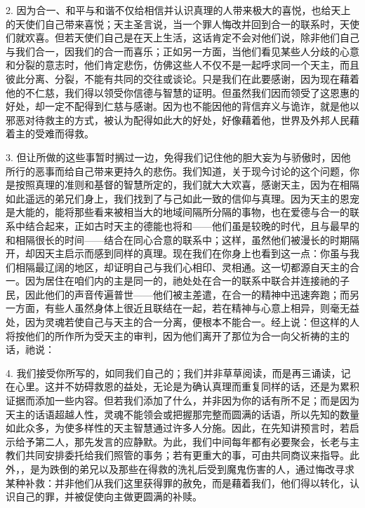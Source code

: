 2. 因为合一、和平与和谐不仅给相信并认识真理的人带来极大的喜悦，也给天上的天使们自己带来喜悦；天主圣言说，当一个罪人悔改并回到合一的联系时，天使们就欢喜。但若天使们自己是在天上生活，这话肯定不会对他们说，除非他们自己与我们合一，因我们的合一而喜乐；正如另一方面，当他们看见某些人分歧的心意和分裂的意志时，他们肯定悲伤，仿佛这些人不仅不是一起呼求同一个天主，而且彼此分离、分裂，不能有共同的交往或谈论。只是我们在此要感谢，因为现在藉着他的不仁慈，我们得以领受你信德与智慧的证明。但虽然我们因而领受了这恩惠的好处，却一定不配得到仁慈与感谢。因为也不能因他的背信弃义与诡诈，就是他以邪恶对待救主的方式，被认为配得如此大的好处，好像藉着他，世界及外邦人民藉着主的受难而得救。\par

3. 但让所做的这些事暂时搁过一边，免得我们记住他的胆大妄为与骄傲时，因他所行的恶事而给自己带来更持久的悲伤。我们知道，关于现今讨论的这个问题，你是按照真理的准则和基督的智慧所定的，我们就大大欢喜，感谢天主，因为在相隔如此遥远的弟兄们身上，我们找到了与己如此一致的信仰与真理。因为天主的恩宠是大能的，能将那些看来被相当大的地域间隔所分隔的事物，也在爱德与合一的联系中结合起来，正如古时天主的德能也将和——他们虽是较晚的时代，且与最早的和相隔很长的时间——结合在同心合意的联系中；这样，虽然他们被漫长的时期隔开，却因天主启示而感到同样的真理。现在我们在你身上也看到这一点：你虽与我们相隔最辽阔的地区，却证明自己与我们心相印、灵相通。这一切都源自天主的合一。因为居住在咱们内的主是同一的，祂处处在合一的联系中联合并连接祂的子民，因此他们的声音传遍普世——他们被主差遣，在合一的精神中迅速奔跑；而另一方面，有些人虽然身体上很近且联结在一起，若在精神与心意上相异，则毫无益处，因为灵魂若使自己与天主的合一分离，便根本不能合一。经上说：但这样的人将按他们的所作所为受天主的审判，因为他们离开了那位为合一向父祈祷的主的话，祂说：\par

4. 我们接受你所写的，如同我们自己的；我们并非草草阅读，而是再三诵读，记在心里。这并不妨碍救恩的益处，无论是为确认真理而重复同样的话，还是为累积证据而添加一些内容。但若我们添加了什么，并非因为你的话有所不足；而是因为天主的话语超越人性，灵魂不能领会或把握那完整而圆满的话语，所以先知的数量如此众多，为使多样性的天主智慧通过许多人分施。因此，在先知讲预言时，若启示给予第二人，那先发言的应静默。为此，我们中间每年都有必要聚会，长老与主教们共同安排委托给我们照管的事务；若有更重大的事，可由共同商议来指导。此外，，是为跌倒的弟兄以及那些在得救的洗礼后受到魔鬼伤害的人，通过悔改寻求某种补救：并非他们从我们这里获得罪的赦免，而是藉着我们，他们得以转化，认识自己的罪，并被促使向主做更圆满的补赎。\par

